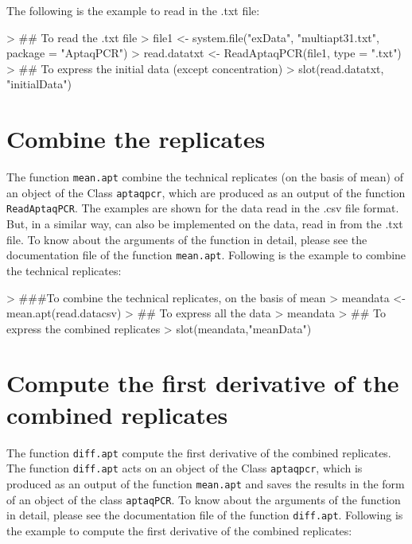 \documentclass[11pt]{article}
\newcommand{\code}[1]{{\tt #1}}
\begin{document}
The following is the example to read in the .txt file:
\begin{Schunk}
\begin{Sinput}
> ## To read the .txt file
> file1 <- system.file("exData", "multiapt31.txt", package = "AptaqPCR")
> read.datatxt <- ReadAptaqPCR(file1, type = ".txt")
> ## To express the initial data (except concentration)
> slot(read.datatxt, "initialData")
\end{Sinput}
\end{Schunk}

\section{Combine the replicates}
The function \code{mean.apt} combine the technical replicates (on the basis of mean) of an object of the Class \code{aptaqpcr}, which are produced as an output of the function \code{ReadAptaqPCR}. The examples are shown for the data read in the .csv file format. But, in a similar way, can also be implemented on the data, read in from the .txt file. To know about the arguments of the function in detail, please see the documentation file of the function \code{mean.apt}. Following is the example to combine the technical replicates:

\begin{Schunk}
\begin{Sinput}
> ###To combine the technical replicates, on the basis of mean
> meandata <- mean.apt(read.datacsv)
> ## To express all the data
> meandata
> ## To express the combined replicates
> slot(meandata,"meanData")
\end{Sinput}
\end{Schunk}

\section{Compute the first derivative of the combined replicates}
The function \code{diff.apt} compute the first derivative of the combined replicates. The function \code{diff.apt} acts on an object of the Class \code{aptaqpcr}, which is produced as an output of the function \code{mean.apt} and saves the results in the form of an object of the class \code{aptaqPCR}. To know about the arguments of the function in detail, please see the documentation file of the function \code{diff.apt}. Following is the example to compute the first derivative of the combined replicates:
\end{document}
